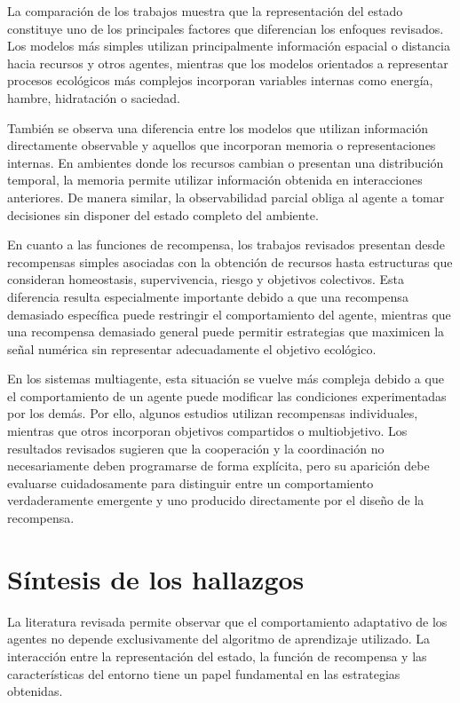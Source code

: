 \documentclass[conference]{IEEEtran}
\begin{document}
La comparación de los trabajos muestra que la representación del estado
constituye uno de los principales factores que diferencian los enfoques
revisados. Los modelos más simples utilizan principalmente información
espacial o distancia hacia recursos y otros agentes, mientras que los
modelos orientados a representar procesos ecológicos más complejos
incorporan variables internas como energía, hambre, hidratación o
saciedad.

También se observa una diferencia entre los modelos que utilizan
información directamente observable y aquellos que incorporan memoria o
representaciones internas. En ambientes donde los recursos cambian o
presentan una distribución temporal, la memoria permite utilizar
información obtenida en interacciones anteriores. De manera similar, la
observabilidad parcial obliga al agente a tomar decisiones sin disponer
del estado completo del ambiente.

En cuanto a las funciones de recompensa, los trabajos revisados
presentan desde recompensas simples asociadas con la obtención de
recursos hasta estructuras que consideran homeostasis, supervivencia,
riesgo y objetivos colectivos. Esta diferencia resulta especialmente
importante debido a que una recompensa demasiado específica puede
restringir el comportamiento del agente, mientras que una recompensa
demasiado general puede permitir estrategias que maximicen la señal
numérica sin representar adecuadamente el objetivo ecológico.

En los sistemas multiagente, esta situación se vuelve más compleja debido
a que el comportamiento de un agente puede modificar las condiciones
experimentadas por los demás. Por ello, algunos estudios utilizan
recompensas individuales, mientras que otros incorporan objetivos
compartidos o multiobjetivo. Los resultados revisados sugieren que la
cooperación y la coordinación no necesariamente deben programarse de
forma explícita, pero su aparición debe evaluarse cuidadosamente para
distinguir entre un comportamiento verdaderamente emergente y uno
producido directamente por el diseño de la recompensa.

\section{Síntesis de los hallazgos}

La literatura revisada permite observar que el comportamiento adaptativo
de los agentes no depende exclusivamente del algoritmo de aprendizaje
utilizado. La interacción entre la representación del estado, la función
de recompensa y las características del entorno tiene un papel
fundamental en las estrategias obtenidas.
\end{document}
